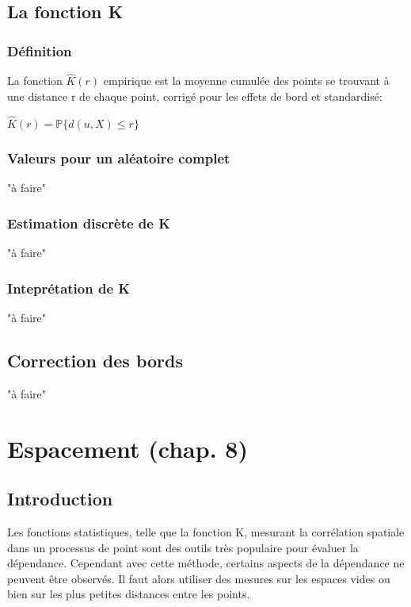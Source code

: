 \documentclass[french,12pt,a4paper]{report}
\begin{document}
\section{La fonction K}

\subsection{Définition}
La fonction \begin{math}\hat{K}(r) \end{math} empirique est la moyenne cumulée des points se trouvant à une distance r de chaque point, corrigé pour les effets de bord et standardisé:
\begin{center}\begin{math} \hat{K}(r) = \mathbb{P}\{ d(u,X) \leq r \} \end{math}\end{center}


\subsection{Valeurs pour un aléatoire complet}
"à faire"


\subsection{Estimation discrète de K}
"à faire"


\subsection{Inteprétation de K}
"à faire"


\section{Correction des bords}
"à faire"


\chapter{Espacement (chap. 8)}

\section{Introduction}
Les fonctions statistiques, telle que la fonction K, mesurant la corrélation spatiale dans un processus de point sont des outils très populaire pour évaluer la dépendance. Cependant avec cette méthode, certains aspects de la dépendance ne peuvent être observés. Il faut alors utiliser des mesures sur les espaces vides ou bien sur les plus petites distances entre les points.
\end{document}
